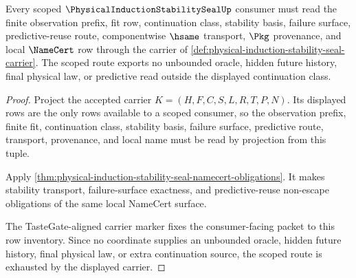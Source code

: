 \begin{theorem}
\label{thm:physical-induction-stability-seal-scoped-route}
Every scoped $\PhysicalInductionStabilitySealUp$ consumer must read the finite observation prefix, fit row, continuation class, stability basis, failure surface, predictive-reuse route, componentwise $\hsame$ transport, $\Pkg$ provenance, and local $\NameCert$ row through the carrier of \autoref{def:physical-induction-stability-seal-carrier}. The scoped route exports no unbounded oracle, hidden future history, final physical law, or predictive read outside the displayed continuation class.
\end{theorem}
\begin{proof}
Project the accepted carrier $K=(H,F,C,S,L,R,T,P,N)$. Its displayed rows are the only rows available to a scoped consumer, so the observation prefix, finite fit, continuation class, stability basis, failure surface, predictive route, transport, provenance, and local name must be read by projection from this tuple.

Apply \autoref{thm:physical-induction-stability-seal-namecert-obligations}. It makes stability transport, failure-surface exactness, and predictive-reuse non-escape obligations of the same local NameCert surface.

The TasteGate-aligned carrier marker fixes the consumer-facing packet to this row inventory. Since no coordinate supplies an unbounded oracle, hidden future history, final physical law, or extra continuation source, the scoped route is exhausted by the displayed carrier.
\end{proof}

